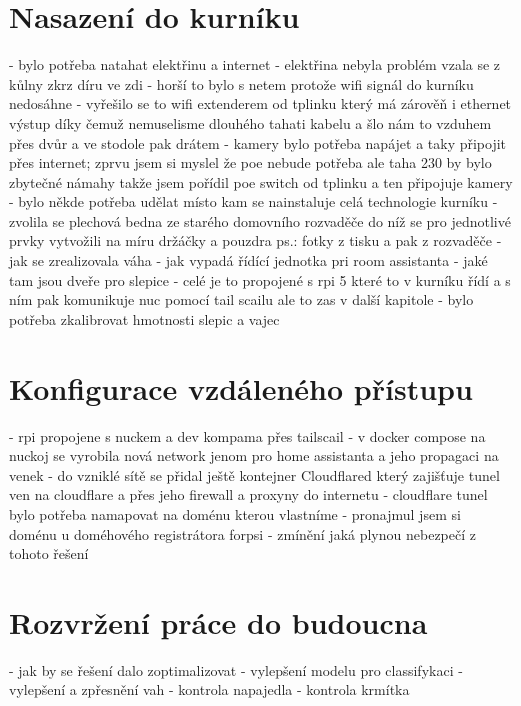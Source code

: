\section{Nasazení do kurníku}
- bylo potřeba natahat elektřinu a internet \newline
- elektřina nebyla problém vzala se z kůlny zkrz díru ve zdi\newline
- horší to bylo s netem protože wifi signál do kurníku nedosáhne\newline
- vyřešilo se to wifi extenderem od tplinku který má zárověň i ethernet výstup díky čemuž nemuselisme dlouhého tahati kabelu a šlo nám to vzduhem přes dvůr a ve stodole pak drátem\newline
- kamery bylo potřeba napájet a taky připojit přes internet; zprvu jsem si myslel že poe nebude potřeba ale taha 230 by bylo zbytečné námahy takže jsem pořídil poe switch od tplinku a ten připojuje kamery\newline
- bylo někde potřeba udělat místo kam se nainstaluje celá technologie kurníku\newline
- zvolila se plechová bedna ze starého domovního rozvaděče do níž se pro jednotlivé prvky vytvožili na míru držáčky a pouzdra ps.: fotky z tisku a pak z rozvaděče\newline
- jak se zrealizovala váha\newline
- jak vypadá řídící jednotka pri room assistanta\newline
- jaké tam jsou dveře pro slepice\newline
- celé je to propojené s rpi 5 které to v kurníku řídí a s ním pak komunikuje nuc pomocí tail scailu ale to zas v další kapitole\newline
- bylo potřeba zkalibrovat hmotnosti slepic a vajec


\section{Konfigurace vzdáleného přístupu}
- rpi propojene s nuckem a dev kompama přes tailscail\newline
- v docker compose na nuckoj se vyrobila nová network jenom pro home assistanta a jeho propagaci na venek\newline
- do vzniklé sítě se přidal ještě kontejner Cloudflared který zajišťuje tunel ven na cloudflare a přes jeho firewall a proxyny do internetu\newline
- cloudflare tunel bylo potřeba namapovat na doménu kterou vlastníme\newline
- pronajmul jsem si doménu u doméhového registrátora forpsi\newline
- zmínění jaká plynou nebezpečí z tohoto řešení


\section{Rozvržení práce do budoucna}
- jak by se řešení dalo zoptimalizovat\newline
- vylepšení modelu pro classifykaci\newline
- vylepšení a zpřesnění vah\newline
- kontrola napajedla\newline
- kontrola krmítka
